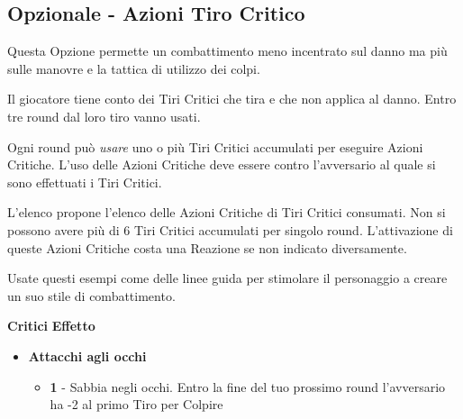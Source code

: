 \begin{multicols}{2}

\subsection{Opzionale - Azioni Tiro Critico}\label{OpzionaleAzioniTiroCritico}\hypertarget{OpzionaleAzioniTiroCritico}{}

Questa Opzione permette un combattimento meno incentrato sul danno ma più sulle manovre e la tattica di utilizzo dei colpi.

Il giocatore tiene conto dei Tiri Critici che tira e che non applica al danno. Entro tre round dal loro tiro vanno usati.

Ogni round può \emph{usare} uno o più Tiri Critici accumulati per eseguire Azioni Critiche. L'uso delle Azioni Critiche deve essere contro l'avversario al quale si sono effettuati i Tiri Critici.

L'elenco propone l'elenco delle Azioni Critiche di Tiri Critici consumati. Non si possono avere più di 6 Tiri Critici accumulati per singolo round.
L'attivazione di queste Azioni Critiche costa una Reazione se non indicato diversamente.

Usate questi esempi come delle linee guida per stimolare il personaggio a creare un suo stile di combattimento.

\medskip

\noindent\textbf{Critici} \hskip 0.5cm \textbf{Effetto}

\medskip

\begin{itemize}[leftmargin=*]
	\setlength{\itemsep}{0pt}

	\item \textbf{Attacchi agli occhi}
	\begin{itemize}[leftmargin=*]
		\setlength{\itemsep}{0pt}
		\item \textbf{1} - Sabbia negli occhi. Entro la fine del tuo prossimo round l'avversario ha -2 al primo Tiro per Colpire


\end{itemize}
\end{itemize}
\end{multicols}
